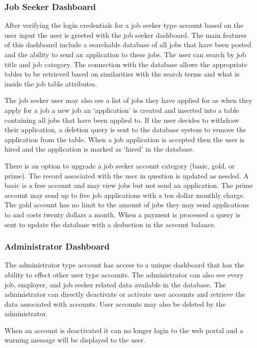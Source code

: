 \documentclass[11pt]{article}
\begin{document}
\subsubsection{Job Seeker Dashboard}

After verifying the login credentials for a job seeker type account based on the user input the user is greeted with the job seeker dashboard. The main features of this dashboard include a searchable database of all jobs that have been posted and the ability to send an application to these jobs. The user can search by job title and job category. The connection with the database allows the appropriate tables to be retrieved based on similarities with the search terms and what is inside the job table attributes. \par 
The job seeker user may also see a list of jobs they have applied for as when they apply for a job a new job an `application' is created and inserted into a table containing all jobs that have been applied to. If the user decides to withdraw their application, a deletion query is sent to the database system to remove the application from the table. When a job application is accepted then the user is hired and the application is marked as `hired' in the database. \par 
There is an option to upgrade a job seeker account category (basic, gold, or prime). The record associated with the user in question is updated as needed. A basic is a free account and may view jobs but not send an application. The prime account may send up to five job applications with a ten dollar monthly charge. The gold account has no limit to the amount of jobs they may send applications to and costs twenty dollars a month. When a payment is processed a query is sent to update the database with a deduction in the account balance.

\subsubsection{Administrator Dashboard}

The administrator type account has access to a unique dashboard that has the ability to effect other user type accounts. The administrator can also see every job, employer, and job seeker related data available in the database. The administrator can directly deactivate or activate user accounts and retrieve the data associated with accounts. User accounts may also be deleted by the administrator. \par
	When an account is deactivated it can no longer login to the web portal and a warning message will be displayed to the user.
\end{document}
